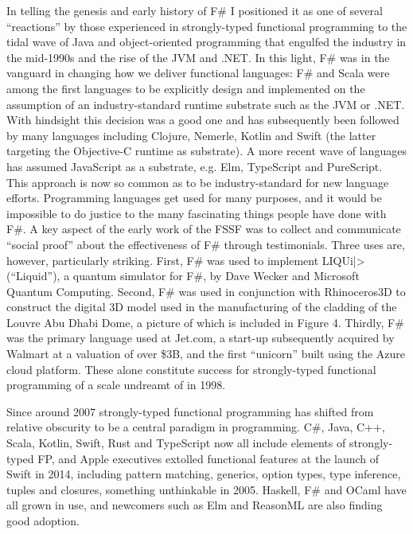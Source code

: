 \documentclass[acmsmall,review]{acmart}\settopmatter{printfolios=true,printccs=false,printacmref=false}
\begin{document}
In telling the genesis and early history of F\# I positioned it as one of several “reactions” by those experienced in strongly-typed functional programming to the tidal wave of Java and object-oriented programming that engulfed the industry in the mid-1990s and the rise of the JVM and .NET.  In this light, F\# was in the vanguard in changing how we deliver functional languages: F\# and Scala were among the first languages to be explicitly design and implemented on the assumption of an industry-standard runtime substrate such as the JVM or .NET.  With hindsight this decision was a good one and has subsequently been followed by many languages including Clojure, Nemerle, Kotlin and Swift (the latter targeting the Objective-C runtime as substrate). A more recent wave of languages has assumed JavaScript as a substrate, e.g. Elm, TypeScript and PureScript.  This approach is now so common as to be industry-standard for new language efforts.
Programming languages get used for many purposes, and it would be impossible to do justice to the many fascinating things people have done with F\#.  A key aspect of the early work of the FSSF was to collect and communicate “social proof” about the effectiveness of F\# through testimonials.   Three uses are, however, particularly striking.  First, F\# was used to implement LIQUi|> (“Liquid”), a quantum simulator for F\#, by Dave Wecker and Microsoft Quantum Computing.  Second, F\# was used in conjunction with Rhinoceros3D to construct the digital 3D model used in the manufacturing of the cladding of the Louvre Abu Dhabi Dome, a picture of which is included in Figure 4.  Thirdly, F\# was the primary language used at Jet.com, a start-up subsequently acquired by Walmart at a valuation of over \$3B, and the first “unicorn” built using the Azure cloud platform. These alone constitute success for strongly-typed functional programming of a scale undreamt of in 1998.

Since around 2007 strongly-typed functional programming has shifted from relative obscurity to be a central paradigm in programming. C\#, Java, C++, Scala, Kotlin, Swift, Rust and TypeScript now all include elements of strongly-typed FP, and Apple executives extolled functional features at the launch of Swift in 2014, including pattern matching, generics, option types, type inference, tuples and closures, something unthinkable in 2005.   Haskell, F\# and OCaml have all grown in use, and newcomers such as Elm and ReasonML are also finding good adoption.
\end{document}
